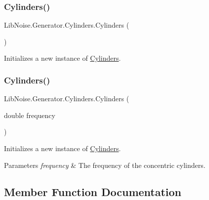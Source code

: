 \subsubsection{\texorpdfstring{Cylinders()}{Cylinders()}\hspace{0.1cm}{\footnotesize\ttfamily [1/2]}}
{\footnotesize\ttfamily Lib\+Noise.\+Generator.\+Cylinders.\+Cylinders (\begin{DoxyParamCaption}{ }\end{DoxyParamCaption})}



Initializes a new instance of \hyperlink{class_lib_noise_1_1_generator_1_1_cylinders}{Cylinders}. 

\mbox{\label{class_lib_noise_1_1_generator_1_1_cylinders_a044e0bbbbedf5f7eabad4e71a9c6dea8}} 
\subsubsection{\texorpdfstring{Cylinders()}{Cylinders()}\hspace{0.1cm}{\footnotesize\ttfamily [2/2]}}
{\footnotesize\ttfamily Lib\+Noise.\+Generator.\+Cylinders.\+Cylinders (\begin{DoxyParamCaption}\item[{double}]{frequency }\end{DoxyParamCaption})}



Initializes a new instance of \hyperlink{class_lib_noise_1_1_generator_1_1_cylinders}{Cylinders}. 


\begin{DoxyParams}{Parameters}
{\em frequency} & The frequency of the concentric cylinders.\\
\hline
\end{DoxyParams}


\subsection{Member Function Documentation}
\mbox{\label{class_lib_noise_1_1_generator_1_1_cylinders_af6be6375a1d1e4ce7c78852abd298f12}} 

